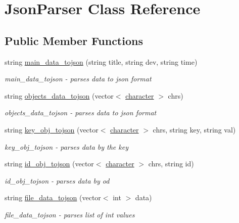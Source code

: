 \hypertarget{classJsonParser}{}\section{Json\+Parser Class Reference}
\label{classJsonParser}
\subsection*{Public Member Functions}
\begin{DoxyCompactItemize}
\item 
string \hyperlink{classJsonParser_ab6783a75b2a42918a2b9aaaac2a0694e}{main\+\_\+data\+\_\+tojson} (string title, string dev, string time)
\begin{DoxyCompactList}\small\item\em main\+\_\+data\+\_\+tojson -\/ parses data to json format \end{DoxyCompactList}\item 
string \hyperlink{classJsonParser_ae144696aea8a0c60f7f0722b6403dac0}{objects\+\_\+data\+\_\+tojson} (vector$<$ \hyperlink{classcharacter}{character} $>$ chrs)
\begin{DoxyCompactList}\small\item\em objects\+\_\+data\+\_\+tojson -\/ parses data to json format \end{DoxyCompactList}\item 
string \hyperlink{classJsonParser_acaf2faf6e1aa12934e5849cb2171d1d0}{key\+\_\+obj\+\_\+tojson} (vector$<$ \hyperlink{classcharacter}{character} $>$ chrs, string key, string val)
\begin{DoxyCompactList}\small\item\em key\+\_\+obj\+\_\+tojson -\/ parses data by the key \end{DoxyCompactList}\item 
string \hyperlink{classJsonParser_a655d5fd06a7e899f280150fb23322be0}{id\+\_\+obj\+\_\+tojson} (vector$<$ \hyperlink{classcharacter}{character} $>$ chrs, string id)
\begin{DoxyCompactList}\small\item\em id\+\_\+obj\+\_\+tojson -\/ parses data by od \end{DoxyCompactList}\item 
string \hyperlink{classJsonParser_af374c4517d8ceadb03e3d6da8f21480d}{file\+\_\+data\+\_\+tojson} (vector$<$ int $>$ data)
\begin{DoxyCompactList}\small\item\em file\+\_\+data\+\_\+tojson -\/ parses list of int values \end{DoxyCompactList}\end{DoxyCompactItemize}


